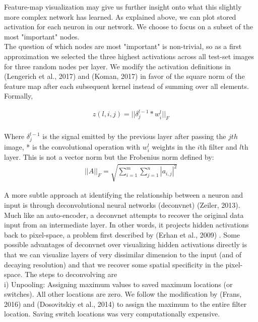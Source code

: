 \documentclass[12pt]{article}
\begin{document}
Feature-map visualization may give us further insight onto what this slightly more complex network has learned. As explained above, we can plot stored activation for each neuron in our network. We choose to focus on a subset of the most "important" nodes. \\

The question of which nodes are most "important" is non-trivial, so as a first approximation we selected the three highest activations across all test-set images for three random nodes per layer. We modify the activation definitions in (Lengerich et al., 2017) \cite{resampling} and (Koman, 2017) \cite{koman} in favor of the square norm of the feature map after each subsequent kernel instead of summing over all elements. Formally,

\begin{align*}
	z(l, i, j) = ||\delta_j^{l-1} * w_{i}^l||_F\\
\end{align*}

Where $\delta_j^{l - 1}$ is the signal emitted by the previous layer after passing the $j th$ image, * is the convolutional operation with $w_i^l$ weights in the $i$th filter and $l$th layer. This is not a vector norm but the Frobenius norm defined by: \\

\begin{align*}
	||A||_F = \sqrt{\sum_{i = 1}^{m} \sum_{j = 1}^{n} |a_{i,j}|^2}
\end{align*}

A more subtle approach at identifying the relationship between a neuron and input is through deconvolutional neural networks (deconvnet) (Zeiler, 2013)\cite{zeiler}. Much like an auto-encoder, a deconvnet attempts to recover the original data input from an intermediate layer. In other words, it projects hidden activations back to pixel-space, a problem first described by (Erhan et al., 2009) \cite{bengio}. Some possible advantages of deconvnet over visualizing hidden activations directly is that we can visualize layers of very dissimilar dimension to the input (and of decaying resolution) and that we recover some spatial specificity in the pixel-space. The steps to deconvolving are \\

i) Unpooling: Assigning maximum values to saved maximum locations (or switches). All other locations are zero. We follow the modification by (Frans, 2016)\cite{kvfrans} and (Dosovitskiy et al., 2014)\cite{oxford} to assign the maximum to the entire filter location. Saving switch locations was very computationally expensive. \\
\end{document}
